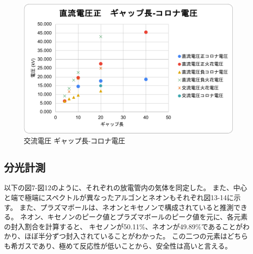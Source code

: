 \documentclass[a4j,twocolumn]{jsarticle}
\begin{document}
\begin{figure}[htb]
    \centering
    \includegraphics[keepaspectratio,width=0.6\columnwidth]{fig/disparity.pdf}
    \caption{交流電圧 ギャップ長-コロナ電圧}
\end{figure}



\subsection*{分光計測}
以下の図7-図12のように、それぞれの放電管内の気体を同定した。
また、中心と端で極端にスペクトルが異なったアルゴンとネオンもそれぞれ図13-14に示す。
また、プラズマボールは、ネオンとキセノンで構成されていると推測できる。
ネオン、キセノンのピーク値とプラズマボールのピーク値を元に、各元素の封入割合を計算すると、
キセノンが50.11$\%$、ネオンが49.89$\%$であることがわかり、ほぼ半分ずつ封入されていることがわかった。
この二つの元素はどちらも希ガスであり、極めて反応性が低いことから、安全性は高いと言える。
\end{document}
